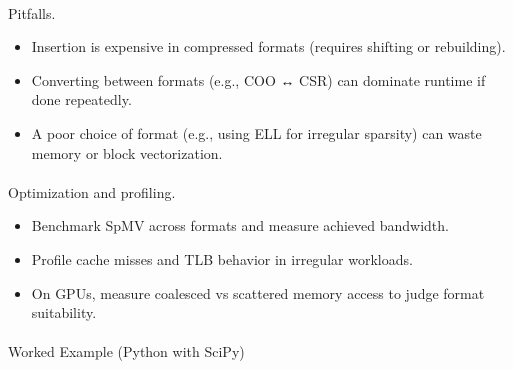 \documentclass[
  letterpaper,
  DIV=11,
  numbers=noendperiod]{scrreprt}
\makeatletter
\let\oldparagraph\paragraph
\renewcommand{\paragraph}{
    \@ifstar
      \xxxParagraphStar
      \xxxParagraphNoStar
  }
\newcommand{\xxxParagraphStar}[1]{\oldparagraph*{#1}\mbox{}}
\newcommand{\xxxParagraphNoStar}[1]{\oldparagraph{#1}\mbox{}}
\providecommand{\tightlist}{%
  \setlength{\itemsep}{0pt}\setlength{\parskip}{0pt}}
\makeatother
\begin{document}
\paragraph{Pitfalls.}\label{pitfalls.-4}

\begin{itemize}
\tightlist
\item
  Insertion is expensive in compressed formats (requires shifting or
  rebuilding).
\item
  Converting between formats (e.g., COO ↔ CSR) can dominate runtime if
  done repeatedly.
\item
  A poor choice of format (e.g., using ELL for irregular sparsity) can
  waste memory or block vectorization.
\end{itemize}

\paragraph{Optimization and
profiling.}\label{optimization-and-profiling.}

\begin{itemize}
\tightlist
\item
  Benchmark SpMV across formats and measure achieved bandwidth.
\item
  Profile cache misses and TLB behavior in irregular workloads.
\item
  On GPUs, measure coalesced vs scattered memory access to judge format
  suitability.
\end{itemize}

\paragraph{Worked Example (Python with
SciPy)}\label{worked-example-python-with-scipy}
\end{document}
